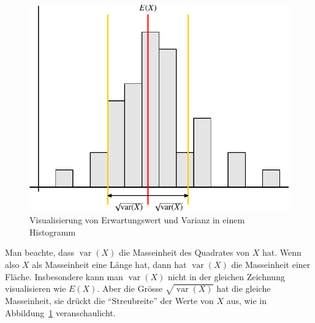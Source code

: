 \begin{figure}
\begin{center}
\includegraphics{images/erwartung-1}
\end{center}
\caption{Visualisierung von Erwartungswert und Varianz in einem Histogramm
\label{histogram}}
\end{figure}

Man beachte, dass $\operatorname{var}(X)$ die Masseinheit des Quadrates
von $X$ hat.
Wenn also $X$ als Masseinheit eine Länge hat,
dann hat $\operatorname{var}(X)$ die Masseinheit einer Fläche.
Insbesondere kann man $\operatorname{var}(X)$ nicht in der gleichen
Zeichnung visualisieren wie $E(X)$.
Aber die Grösse $\sqrt{\operatorname{var}(X)}$ hat die gleiche Masseinheit, sie
drückt die ``Streubreite'' der Werte von $X$ aus,
wie in Abbildung~\ref{histogram} veranschaulicht.

